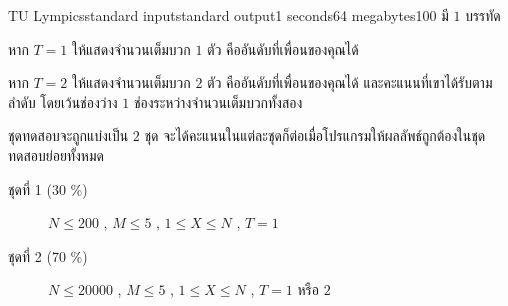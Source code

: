 \documentclass[11pt,a4paper]{article}
\begin{document}
\begin{problem}{TU Lympics}{standard input}{standard output}{1 seconds}{64 megabytes}{100}
\OutputFile
มี $1$ บรรทัด 

หาก $T = 1$ ให้แสดงจำนวนเต็มบวก $1$ ตัว คืออันดับที่เพื่อนของคุณได้ 

หาก $T = 2$ ให้แสดงจำนวนเต็มบวก $2$ ตัว คืออันดับที่เพื่อนของคุณได้ และคะแนนที่เขาได้รับตามลำดับ โดยเว้นช่องว่าง $1$ ช่องระหว่างจำนวนเต็มบวกทั้งสอง

\Scoring
ชุดทดสอบจะถูกแบ่งเป็น $2$ ชุด จะได้คะแนนในแต่ละชุดก็ต่อเมื่อโปรแกรมให้ผลลัพธ์ถูกต้องในชุดทดสอบย่อยทั้งหมด

\begin{description}

\item[ชุดที่ 1 (30 \%)]  $N \leq 200$ , $M \leq 5$ , $1 \leq X \leq N$ , $T=1$

\item[ชุดที่ 2 (70 \%)]  $N\leq20000$  , $M\leq5$ , $1 \leq X \leq N $ , $T=1$ หรือ $2$

\end{description}

\Examples

\begin{example}
%
%
\end{example}

\end{problem}
\end{document}
